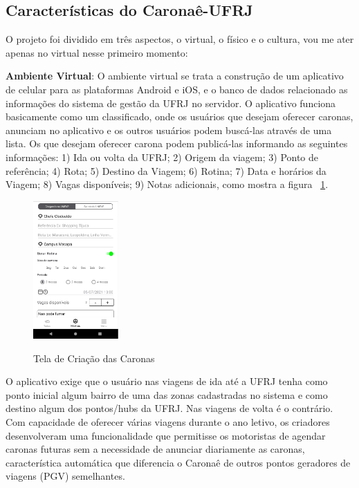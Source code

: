 \subsection{Características do Caronaê-UFRJ}

O projeto foi dividido em três aspectos, o virtual, o físico e o cultura, vou me ater apenas no virtual nesse primeiro momento:

\textbf{Ambiente Virtual}: O ambiente virtual se trata a construção de um aplicativo de celular para as plataformas Android e iOS, e o banco de dados relacionado as informações do sistema de gestão da UFRJ no servidor. O aplicativo funciona basicamente como um classificado, onde os usuários que desejam oferecer caronas, anunciam no aplicativo e os outros usuários podem buscá-las através de uma lista. Os que desejam oferecer carona podem publicá-las informando as seguintes informações: 1) Ida ou volta da UFRJ; 2) Origem da viagem; 3) Ponto de referência; 4) Rota; 5) Destino da Viagem; 6) Rotina; 7) Data e horários da Viagem; 8) Vagas disponíveis; 9) Notas adicionais, como mostra a figura ~\ref{fig:publicar_carona}.

\begin{figure}[!hbtp]
	\centering
	\caption{Tela de Criação das Caronas}
	\includegraphics[width=0.29\textwidth]{./04-figuras/caronae/criacao_da_carona_carona_ufrj.png}
	\label{fig:publicar_carona}
\end{figure}

O aplicativo exige que o usuário nas viagens de ida até a UFRJ tenha como ponto inicial algum bairro de uma das zonas cadastradas no sistema e como destino algum dos pontos/hubs da UFRJ. Nas viagens de volta é o contrário. Com capacidade de oferecer várias viagens durante o ano letivo, os criadores desenvolveram uma funcionalidade que permitisse os motoristas de agendar caronas futuras sem a necessidade de anunciar diariamente as caronas, característica automática que diferencia o Caronaê de outros pontos geradores de viagens (PGV) semelhantes.


